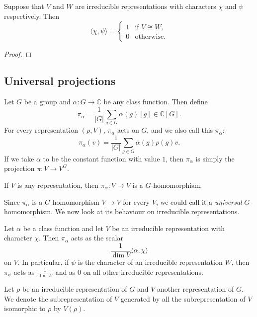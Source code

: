 \begin{corollary}
    Suppose that $V$ and $W$ are irreducible representations with characters $\chi$ and $\psi$ respectively. Then
    \[ \langle \chi, \psi \rangle = \begin{cases}
            1 & \text{if $V \cong W$}, \\
            0 & \text{otherwise}.
        \end{cases} \]
\end{corollary}

\begin{proof}

\end{proof}

\subsection{Universal projections}

Let $G$ be a group and $\alpha: G \to \mathbb C$ be any class function. Then define
\[ \pi_\alpha = \frac1{\lvert G \rvert} \sum_{g \in G} \overline\alpha(g) [g] \in \mathbb C[G]. \]
For every representation $(\rho, V)$, $\pi_\alpha$ acts on $G$, and we also call this $\pi_\alpha$:
\[ \pi_{\alpha}(v) = \frac1{\lvert G \rvert} \sum_{g \in G} \overline\alpha(g) \rho(g) v. \]
If we take $\alpha$ to be the constant function with value $1$, then $\pi_\alpha$ is simply the projection $\pi: V \to V^G$.


\begin{lemma}
    If $V$ is any representation, then $\pi_\alpha: V \to V$ is a $G$-homomorphism.
\end{lemma}

Since $\pi_\alpha$ is a $G$-homomorphism $V \to V$ for every $V$, we could call it a \emph{universal} $G$-homomorphism. We now look at its behaviour on irreducible representations.

\begin{proposition}
    Let $\alpha$ be a class function and let $V$ be an irreducible representation with character $\chi$. Then $\pi_\alpha$ acts as the scalar
    \[ \frac{1}{\dim V} \langle \alpha, \chi \rangle \]
    on $V$. In particular, if $\psi$ is the character of an irreducible representation $W$, then $\pi_\psi$ acts as $\frac{1}{\dim W}$ and as $0$ on all other irreducible representations.
\end{proposition}

Let $\rho$ be an irreducible representation of $G$ and $V$ another representation of $G$. We denote the subrepresentation of $V$ generated by all the subrepresentation of $V$ isomorphic to $\rho$ by $V(\rho)$.

